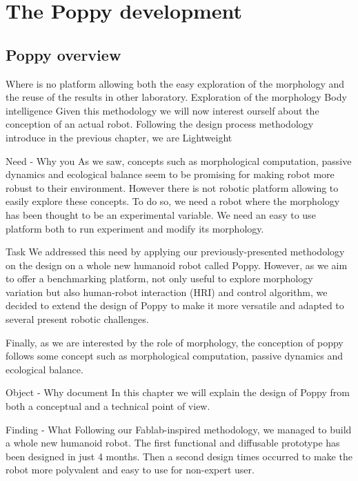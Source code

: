 

% 


\chapter{The Poppy development} %

\section{Poppy overview} %

Where is no platform allowing both the easy exploration of the morphology and the reuse of the results in other laboratory.
Exploration of the morphology
Body intelligence
Given this methodology we will now interest ourself about the conception of an actual robot.
Following the design process methodology introduce in the previous chapter, we are
Lightweight


Need - Why you
As we saw, concepts such as morphological computation, passive dynamics and ecological balance seem to be promising for making robot more robust to their environment. However there is not robotic platform allowing to easily explore these concepts. To do so, we need a robot where the morphology has been thought to be an experimental variable.
We need an easy to use platform both to run experiment and modify its morphology.


Task
We addressed this need by applying our previously-presented methodology on the design on a whole new humanoid robot called Poppy.
However, as we aim to offer a benchmarking platform, not only useful to explore morphology variation but also human-robot interaction (HRI) and control algorithm, we decided to extend the design of Poppy to make it more versatile and adapted to several present robotic challenges.

Finally, as we are interested by the role of morphology, the conception of poppy follows some concept such as morphological computation, passive dynamics and ecological balance.

Object - Why document
In this chapter we will explain the design of Poppy from both a conceptual and a technical point of view.

Finding - What
Following our Fablab-inspired methodology, we managed to build a whole new humanoid robot. The first functional and diffusable prototype has been designed in just 4 months. Then a second design times occurred to make the robot more polyvalent and easy to use for non-expert user.

